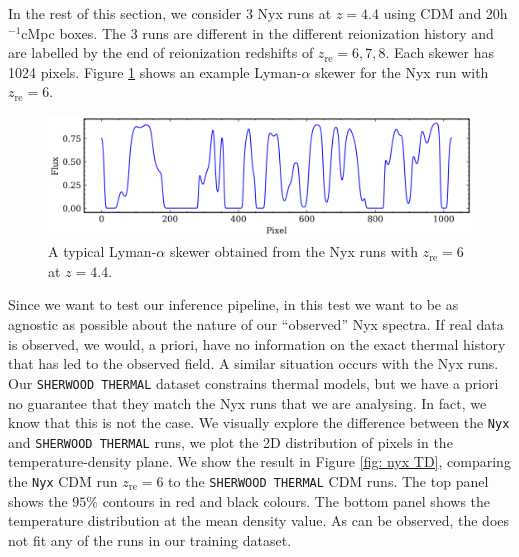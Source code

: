 In the rest of this section, we consider 3 Nyx runs at $z=4.4$ using CDM and 20h$^{-1}$cMpc boxes. The 3 runs are different in the different reionization history and are labelled by the end of reionization redshifts of $z_\mathrm{re}=6,7,8$. Each skewer has 1024 pixels. Figure \ref{fig: nyx skewer} shows an example Lyman-$\alpha$ skewer for the Nyx run with $z_\mathrm{re}=6$.


\begin{figure}
    \centering
    \includegraphics[width=0.8\linewidth]{img/ML/nyx_skewer.png}
    \caption{A typical Lyman-$\alpha$ skewer obtained from the Nyx runs with $z_\mathrm{re}=6$ at $z=4.4$.}
    \label{fig: nyx skewer}
\end{figure}
Since we want to test our inference pipeline, in this test we want to be as agnostic as possible about the nature of our ``observed'' Nyx spectra. If real data is observed, we would, a priori, have no information on the exact thermal history that has led to the observed field. A similar situation occurs with the Nyx runs. Our \texttt{SHERWOOD THERMAL} dataset constrains thermal models, but we have a priori no guarantee that they match the Nyx runs that we are analysing. In fact, we know that this is not the case. We visually explore the difference between the \texttt{Nyx} and \texttt{SHERWOOD THERMAL} runs, we plot the 2D distribution of pixels in the temperature-density plane. We show the result in Figure \ref{fig: nyx TD}, comparing the \texttt{Nyx} CDM run $z_\mathrm{re}=6$ to the \texttt{SHERWOOD THERMAL} CDM runs. The top panel shows the $95\%$ contours in red and black colours. The bottom panel shows the temperature distribution at the mean density value. As can be observed, the  does not fit any of the runs in our training dataset.


